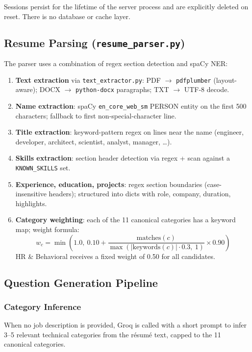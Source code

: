 \documentclass[12pt,a4paper]{article}
\begin{document}
Sessions persist for the lifetime of the server process and are explicitly deleted on reset. There is no database or cache layer.

\subsection{Resume Parsing (\texttt{resume\_parser.py})}

The parser uses a combination of regex section detection and spaCy NER:

\begin{enumerate}[leftmargin=2em]
  \item \textbf{Text extraction} via \texttt{text\_extractor.py}: PDF $\rightarrow$ \texttt{pdfplumber} (layout-aware); DOCX $\rightarrow$ \texttt{python-docx} paragraphs; TXT $\rightarrow$ UTF-8 decode.
  \item \textbf{Name extraction}: spaCy \texttt{en\_core\_web\_sm} PERSON entity on the first 500 characters; fallback to first non-special-character line.
  \item \textbf{Title extraction}: keyword-pattern regex on lines near the name (engineer, developer, architect, scientist, analyst, manager, \ldots).
  \item \textbf{Skills extraction}: section header detection via regex + scan against a \texttt{KNOWN\_SKILLS} set.
  \item \textbf{Experience, education, projects}: regex section boundaries (case-insensitive headers); structured into dicts with role, company, duration, highlights.
  \item \textbf{Category weighting}: each of the 11 canonical categories has a keyword map; weight formula:
  \[
    w_c = \min\!\left(1.0,\ 0.10 + \frac{\text{matches}(c)}{\max\!\left(\lvert\text{keywords}(c)\rvert \cdot 0.3,\ 1\right)} \times 0.90\right)
  \]
  HR \& Behavioral receives a fixed weight of 0.50 for all candidates.
\end{enumerate}

\subsection{Question Generation Pipeline}
\label{sec:qgen}

\subsubsection{Category Inference}

When no job description is provided, Groq is called with a short prompt to infer 3--5 relevant technical categories from the r\'esum\'e text, capped to the 11 canonical categories.
\end{document}
